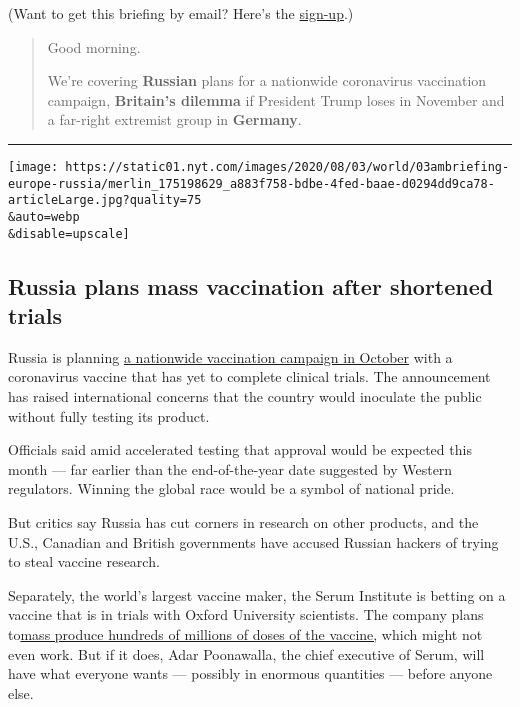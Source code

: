 (Want to get this briefing by email? Here's the
\href{https://www.nytimes.com/morning-briefing}{sign-up}.)

\begin{quote}
Good morning.

We're covering \textbf{Russian} plans for a nationwide coronavirus
vaccination campaign, \textbf{Britain's dilemma} if President Trump
loses in November and a far-right extremist group in \textbf{Germany}.
\end{quote}

\begin{center}\rule{0.5\linewidth}{\linethickness}\end{center}

\texttt{[image: https://static01.nyt.com/images/2020/08/03/world/03ambriefing-europe-russia/merlin\_175198629\_a883f758-bdbe-4fed-baae-d0294dd9ca78-articleLarge.jpg?quality=75\\\&auto=webp\\\&disable=upscale]}

\hypertarget{russia-plans-mass-vaccination-after-shortened-trials}{%
\subsection{Russia plans mass vaccination after shortened
trials}\label{russia-plans-mass-vaccination-after-shortened-trials}}

Russia is planning
\href{https://www.nytimes.com/2020/08/02/world/europe/russia-trials-vaccine-October.html}{a
nationwide vaccination campaign in October} with a coronavirus vaccine
that has yet to complete clinical trials. The announcement has raised
international concerns that the country would inoculate the public
without fully testing its product.

Officials said amid accelerated testing that approval would be expected
this month --- far earlier than the end-of-the-year date suggested by
Western regulators. Winning the global race would be a symbol of
national pride.

But critics say Russia has cut corners in research on other products,
and the U.S., Canadian and British governments have accused Russian
hackers of trying to steal vaccine research.

Separately, the world's largest vaccine maker, the Serum Institute is
betting on a vaccine that is in trials with Oxford University
scientists. The company plans
to\href{https://www.nytimes.com/2020/08/01/world/asia/coronavirus-vaccine-india.html}{mass
produce hundreds of millions of doses of the vaccine,} which might not
even work. But if it does, Adar Poonawalla, the chief executive of
Serum, will have what everyone wants --- possibly in enormous quantities
--- before anyone else.

